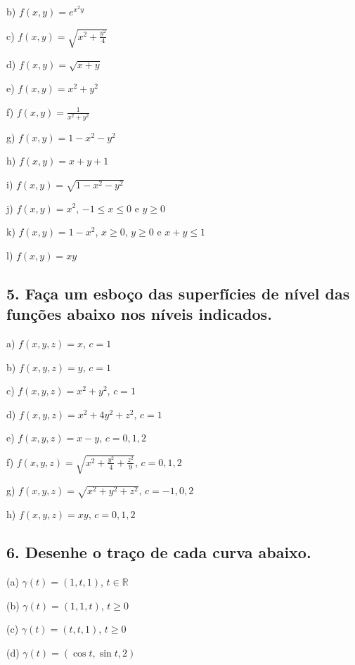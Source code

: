 \documentclass{article}
\begin{document}
        b) $f(x, y) = e^{x^2y}$

        c) $f(x, y) = \sqrt{x^2 + \frac{y^2}{4}}$

        d) $f(x, y) = \sqrt{x + y}$

        e) $f(x, y) = x^2 + y^2$

        f) $f(x, y) = \frac{1}{x^2 + y^2}$

        g) $f(x, y) = 1 - x^2 - y^2$

        h) $f(x, y) = x + y + 1$

        i) $f(x, y) = \sqrt{1 - x^2 - y^2}$

        j) $f(x, y) = x^2$, $-1 \leq x \leq 0$ e $y \geq 0$

        k) $f(x, y) = 1 - x^2$, $x \geq 0$, $y \geq 0$ e $x + y \leq 1$

        l) $f(x, y) = xy$

    \subsection*{5. Faça um esboço das superfícies de nível das funções abaixo nos níveis indicados.}
        \hspace*{12px}
        a) $f(x, y, z) = x$, $c = 1$

        b) $f(x, y, z) = y$, $c = 1$

        c) $f(x, y, z) = x^2 + y^2$, $c = 1$

        d) $f(x, y, z) = x^2 + 4y^2 + z^2$, $c = 1$

        e) $f(x, y, z) = x - y$, $c = 0, 1, 2$

        f) $f(x, y, z) = \sqrt{x^2 + \frac{y^2}{4} + \frac{z^2}{9}}$, $c = 0, 1, 2$

        g) $f(x, y, z) = \sqrt{x^2 + y^2 + z^2}$, $c = -1, 0, 2$

        h) $f(x, y, z) = xy$, $c = 0, 1, 2$

    \subsection*{6. Desenhe o traço de cada curva abaixo.}
        \hspace*{12px}
        (a) $\gamma(t) = (1, t, 1)$, $t \in \mathbb{R}$

        (b) $\gamma(t) = (1, 1, t)$, $t \geq 0$

        (c) $\gamma(t) = (t, t, 1)$, $t \geq 0$

        (d) $\gamma(t) = (\cos t, \sin t, 2)$
\end{document}
